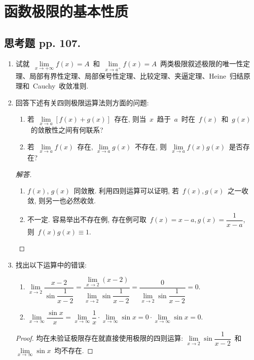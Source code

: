 \documentclass[UTF8,a4paper,11pt,twoside]{book}
\begin{document}
\section{函数极限的基本性质}
\subsection{思考题 pp. 107.}
\begin{enumerate}
	\item 试就~$\lim\limits_{x\to+\infty} f(x)=A$~和~$\lim\limits_{x\to a^{+}} f(x)=A$~两类极限叙述极限的唯一性定理、局部有界性定理、局部保号性定理、比较定理、夹逼定理、Heine~归结原理和~Cauchy~收敛准则.

	\item 回答下述有关四则极限运算法则方面的问题:
	      \begin{enumerate}[(1)]
		      \item 若~$\lim\limits_{x\to a} [f(x)+g(x)]$~存在, 则当~$x$~趋于~$a$~时在~$f(x)$~和~$g(x)$~的敛散性之间有何联系?
		      \item 若~$\lim\limits_{x\to a} f(x)$~存在, $\lim\limits_{x\to a} g(x)$~不存在, 则~$\lim\limits_{x\to a} f(x)g(x)$~是否存在?
	      \end{enumerate}
	      \begin{proof}[解答]
		      \begin{enumerate}[(1)]
			      \item $f(x)$, $g(x)$~同敛散. 利用四则运算可以证明, 若~$f(x),g(x)$~之一收敛, 则另一也必然收敛.
			      \item 不一定. 容易举出不存在例, 存在例可取~$f(x)=x-a, g(x)=\dfrac{1}{x-a}$, 则~$f(x)g(x)\equiv 1$. \qedhere
		      \end{enumerate}
	      \end{proof}

	\item 找出以下运算中的错误:
	      \begin{enumerate}[(1)]
		      \item $\lim\limits_{x\to 2} \dfrac{x-2}{\sin{\dfrac{1}{x-2}}}=\dfrac{\lim\limits_{x\to 2} (x-2)}{\lim\limits_{x\to 2} \sin{\dfrac{1}{x-2}}}=\dfrac{0}{\lim\limits_{x\to 2}\sin{\dfrac{1}{x-2}}}=0$.
		      \item $\lim\limits_{x\to\infty}\dfrac{\sin{x}}{x}=\lim\limits_{x\to\infty} \dfrac{1}{x}\cdot \lim\limits_{x\to\infty} \sin{x} =0\cdot\lim\limits_{x\to\infty} \sin{x}=0$.
	      \end{enumerate}
	      \begin{proof}
		      均在未验证极限存在就直接使用极限的四则运算: $\lim\limits_{x\to 2}\sin{\dfrac{1}{x-2}}$~和~$\lim\limits_{x\to\infty} \sin{x}$~均不存在. \qedhere
	      \end{proof}


\end{enumerate}
\end{document}
